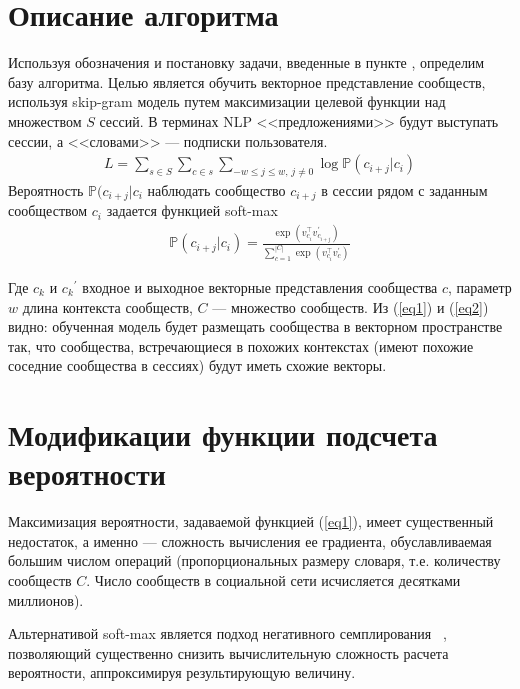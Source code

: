 \documentclass[times,specification,annotation]{itmo-student-thesis}
\begin{document}
\section{Описание алгоритма}\label{sec:algo}

Используя обозначения и постановку задачи, введенные в пункте \label{sec:intro}, определим базу алгоритма. Целью является обучить векторное представление сообществ, используя skip-gram \cite{mikolov2013distributed} модель путем максимизации целевой функции над множеством $S$ сессий. В терминах NLP <<предложениями>> будут выступать сессии, а <<словами>> --- подписки пользователя.
\begin{align}
L = \sum_{s \in S}\sum_{c \in s}\sum_{-w \leq j \leq w,\, j \ne 0}\log \mathbb{P}(c_{i + j} | c_i) \label{eq1}
\end{align}
Вероятность $\mathbb{P}(c_{i + j} | c_i$ наблюдать сообщество $c_{i + j}$ в сессии рядом с заданным сообществом $c_i$ задается функцией soft-max 
\begin{align}
\mathbb{P}(c_{i + j} | c_i) = \frac{\exp(v_{c_i}^\top v_{c_{i + j}}^{'})}{\sum_{c = 1}^{|C|}\exp(v_{c_i}^\top v_{c}^{'})}\label{eq2}
\end{align}

Где ${c_k}$ и ${c_k}^{'}$ входное и выходное векторные представления сообщества $c$, параметр $w$ длина контекста сообществ, $C$ --- множество сообществ. 
Из (\ref{eq1}) и (\ref{eq2}) видно: обученная модель будет размещать сообщества в векторном пространстве так, что сообщества, встречающиеся в похожих контекстах (имеют похожие соседние сообщества в сессиях) будут иметь схожие векторы.  

\section{Модификации функции подсчета вероятности }\label{sec:prob}
Максимизация вероятности, задаваемой функцией
(\ref{eq1}), имеет существенный недостаток, а именно --- сложность вычисления ее градиента, обуславливаемая большим числом операций (пропорциональных размеру словаря, т.е. количеству сообществ $C$. Число сообществ в социальной сети исчисляется десятками миллионов).

Альтернативой soft-max является подход негативного семплирования ~\cite{mikolov2013distributed}, позволяющий существенно снизить вычислительную сложность расчета вероятности, аппроксимируя результирующую величину.

\end{document}
